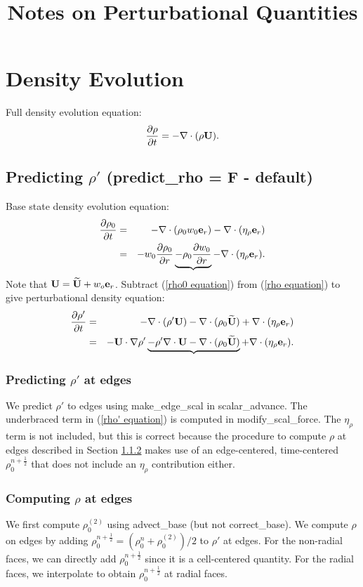 \documentclass[11pt]{article}
\title{Notes on Perturbational Quantities}
\def\half  {\frac{1}{2}}
\def\eb    {{\bf e}}
\def\Ub    {{\bf U}}
\def\Ubt   {\widetilde{\bf U}}
\begin{document}
\maketitle
\tableofcontents
\cleardoublepage

\section{Density Evolution}
Full density evolution equation:
\begin{equation}
\frac{\partial\rho}{\partial t} = -\nabla\cdot(\rho\Ub). \label{rho equation}
\end{equation}
\subsection{Predicting $\rho'$ (predict\_rho = F - default)}
Base state density evolution equation:
\begin{eqnarray}
\frac{\partial\rho_0}{\partial t} &=& -\nabla\cdot(\rho_0 w_0 \eb_r) - \nabla\cdot(\eta_\rho \eb_r) \nonumber \\
&=& -w_0\frac{\partial\rho_0}{\partial r} \underbrace{- \rho_0\frac{\partial w_0}{\partial r}} - \nabla\cdot(\eta_\rho \eb_r). \label{rho0 equation}
\end{eqnarray}
Note that $\Ub = \Ubt + w_o\eb_r$.  Subtract (\ref{rho0 equation}) from (\ref{rho equation}) to give perturbational density equation:
\begin{eqnarray}
\frac{\partial\rho'}{\partial t} &=& -\nabla\cdot(\rho'\Ub) - \nabla\cdot(\rho_0\Ubt) + \nabla\cdot(\eta_\rho \eb_r) \nonumber \\
&=& -\Ub\cdot\nabla\rho' \underbrace{- \rho'\nabla\cdot\Ub - \nabla\cdot(\rho_0\Ubt)} + \nabla\cdot(\eta_\rho \eb_r).\label{rho' equation}
\end{eqnarray}
\subsubsection{Predicting $\rho'$ at edges}
We predict $\rho'$ to edges using make\_edge\_scal in scalar\_advance.  The underbraced term in (\ref{rho' equation}) is computed in modify\_scal\_force.  The $\eta_\rho$ term is not included, but this is correct because the procedure to compute $\rho$ at edges described in Section \ref{Computing rho at edges} makes use of an edge-centered, time-centered $\rho_0^{n+\half}$ that does not include an $\eta_\rho$ contribution either.
\subsubsection{Computing $\rho$ at edges}\label{Computing rho at edges}
We first compute $\rho_0^{(2)}$ using advect\_base (but not correct\_base).  We compute $\rho$ on edges by adding $\rho_0^{n+\half} = (\rho_0^n + \rho_0^{(2)}) / 2$ to $\rho'$ at edges. For the non-radial faces, we can directly add $\rho_0^{n+\half}$ since it is a cell-centered quantity.  For the radial faces, we interpolate to obtain $\rho_0^{n+\half}$ at radial faces.
\end{document}
